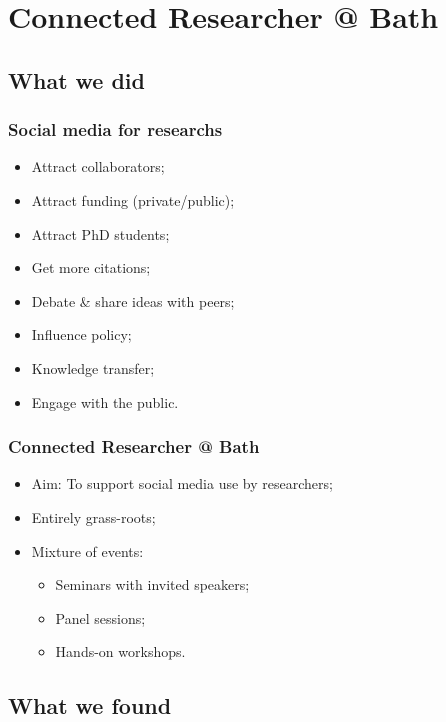 \documentclass{beamer}
\begin{document}
\section{Connected Researcher @ Bath}

\subsection{What we did}

\begin{frame}
  \frametitle{Social media for researchs}
  
  \begin{itemize}
    \item Attract collaborators;
    \item Attract funding (private/public);
    \item Attract PhD students;
    \item Get more citations;
    \item Debate \& share ideas with peers;
    \item Influence policy;
    \item Knowledge transfer;
    \item Engage with the public.
  \end{itemize}
\end{frame}
\begin{frame}
  \frametitle{Connected Researcher @ Bath}
  
  \begin{itemize}
    \item Aim: To support social media use by researchers;
    \item Entirely grass-roots;
    \item Mixture of events:
      \begin{itemize}
        \item Seminars with invited speakers;
        \item Panel sessions;
        \item Hands-on workshops.
      \end{itemize}
  \end{itemize}
\end{frame}

\subsection{What we found}
\end{document}
